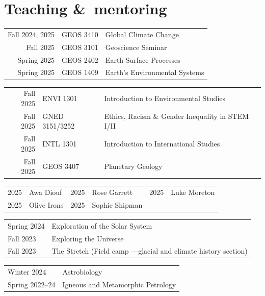 \section{Teaching \&\ mentoring}
\begin{tabular}{r ll} 
	Fall 2024, 2025 & GEOS 3410 & Global Climate Change\\
	Fall 2025 & GEOS 3101 & Geoscience Seminar\\
	Spring 2025 & GEOS 2402 & Earth Surface Processes\\
	Spring 2025 & GEOS 1409 & Earth's Environmental Systems\\
\end{tabular}

\begin{tabular}{r ll} 
	Fall 2025 & ENVI 1301 & Introduction to Environmental Studies \\
	Fall 2025 & GNED 3151/3252 & Ethics, Racism \& Gender Inequality in STEM I/II\\
	Fall 2025 & INTL 1301 & Introduction to International Studies\\
	Fall 2025 & GEOS 3407 & Planetary Geology
\end{tabular}

\begin{tabular}{ll|ll|ll}
	2025\ongoing & Awa Diouf
	&
	2025\ongoing & Rose Garrett
	& 
	2025\ongoing & Luke Moreton
	\\
	2025\ongoing & Olive Irons
	&
	2025\ongoing & Sophie Shipman
\end{tabular}

\begin{tabular}{l l}
	Spring 2024 & Exploration of the Solar System \\
	Fall 2023 & Exploring the Universe \\
	Fall 2023 & The Stretch \normalfont (Field camp ---glacial and climate history section)
\end{tabular}

\begin{tabular}{p{.15\linewidth} l} %
	Winter 2024 & Astrobiology\\
	Spring 2022--24 & Igneous and Metamorphic Petrology
\end{tabular}

